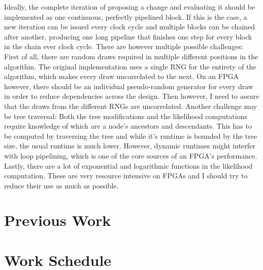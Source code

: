 Ideally, the complete iteration of proposing a change and evaluating it should be implemented as one continuous, perfectly pipelined block. If this is the case, a new iteration can be issued every clock cycle and multiple blocks can be chained after another, producing one long pipeline that finishes one step for every block in the chain ever clock cycle. There are however multiple possible challenges: First of all, there are random draws required in multiple different positions in the algorithm. The original implementation uses a single \ac{RNG} for the entirety of the algorithm, which makes every draw uncorrelated to the next. On an \ac{FPGA} however, there should be an individual pseudo-random generator for every draw in order to reduce dependencies across the design. Then however, I need to assure that the draws from the different \acp{RNG} are uncorrelated. Another challenge may be tree traversal: Both the tree modifications and the likelihood computations require knowledge of which are a node's ancestors and descendants. This has to be computed by traversing the tree and while it's runtime is bounded by the tree size, the usual runtime is much lower. However, dynamic runtimes might interfer with loop pipelining, which is one of the core sources of an \ac{FPGA}'s performance. Lastly, there are a lot of exponential and logarithmic functions in the likelihood computation. These are very resource intensive on \acp{FPGA} and I should try to reduce their use as much as possible.

\section{Previous Work}

\section{Work Schedule}